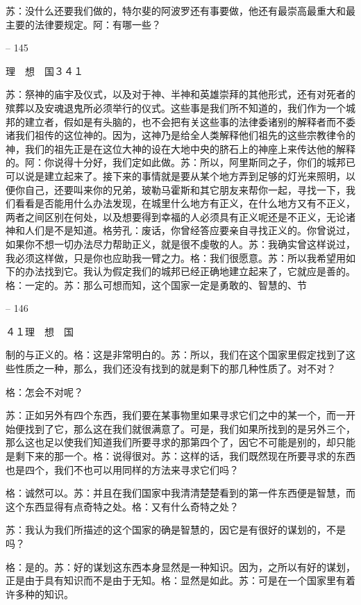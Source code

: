 \documentclass[11pt,oneside]{book}
\begin{document}
\begin{common-format}
    苏：没什么还要我们做的，特尔斐的阿波罗还有事要做，他还有最崇高最重大和最主要的法律要规定。阿：有哪一些？

    

-- 145

    理　想　国３４１

    苏：祭神的庙宇及仪式，以及对于神、半神和英雄崇拜的其他形式，还有对死者的殡葬以及安魂退鬼所必须举行的仪式。这些事是我们所不知道的，我们作为一个城邦的建立者，假如是有头脑的，也不会把有关这些事的法律委诸别的解释者而不委诸我们祖传的这位神的。因为，这神乃是给全人类解释他们祖先的这些宗教律令的神，我们的祖先正是在这位大神的设在大地中央的脐石上的神座上来传达他的解释的。阿：你说得十分好，我们定如此做。苏：所以，阿里斯同之子，你们的城邦已可以说是建立起来了。接下来的事情就是要从某个地方弄到足够的灯光来照明，以便你自己，还要叫来你的兄弟，玻勒马霍斯和其它朋友来帮你一起，寻找一下，我们看看是否能用什么办法发现，在城里什么地方有正义，在什么地方又有不正义，两者之间区别在何处，以及想要得到幸福的人必须具有正义呢还是不正义，无论诸神和人们是不是知道。格劳孔：废话，你曾经答应要亲自寻找正义的。你曾说过，如果你不想一切办法尽力帮助正义，就是很不虔敬的人。苏：我确实曾这样说过，我必须这样做，只是你也应助我一臂之力。格：我们很愿意。苏：所以我希望用如下的办法找到它。我认为假定我们的城邦已经正确地建立起来了，它就应是善的。格：一定的。苏：那么可想而知，这个国家一定是勇敢的、智慧的、节

    

-- 146

    ４１理　想　国

    制的与正义的。格：这是非常明白的。苏：所以，我们在这个国家里假定找到了这些性质之一种，那么，我们还没有找到的就是剩下的那几种性质了。对不对？

    格：怎会不对呢？

    苏：正如另外有四个东西，我们要在某事物里如果寻求它们之中的某一个，而一开始便找到了它，那么这在我们就很满意了。可是，我们如果所找到的是另外三个，那么这也足以使我们知道我们所要寻求的那第四个了，因它不可能是别的，却只能是剩下来的那一个。格：说得很对。苏：这样的话，我们既然现在所要寻求的东西也是四个，我们不也可以用同样的方法来寻求它们吗？

    格：诚然可以。苏：并且在我们国家中我清清楚楚看到的第一件东西便是智慧，而这个东西显得有点奇特之处。格：又有什么奇特之处？

    苏：我认为我们所描述的这个国家的确是智慧的，因它是有很好的谋划的，不是吗？

    格：是的。苏：好的谋划这东西本身显然是一种知识。因为，之所以有好的谋划，正是由于具有知识而不是由于无知。格：显然是如此。苏：可是在一个国家里有着许多种的知识。


\end{common-format}
\end{document}
